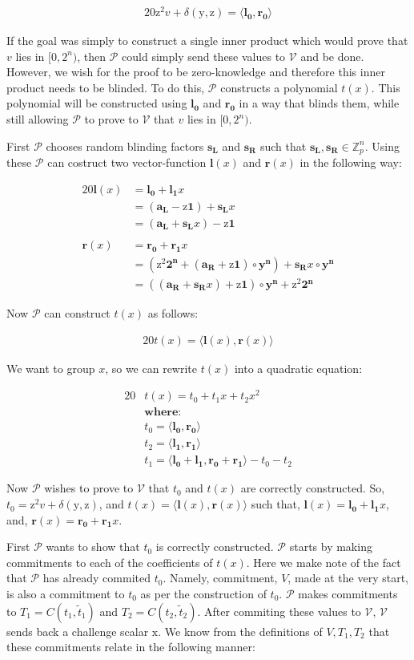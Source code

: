 \documentclass{article}
\newcommand{\eq}[1]{\begin{alignat*}{20}#1\end{alignat*}}
\renewcommand{\vec}[1]{\boldsymbol{#1}}
\newcommand{\ran}[1]{\mathrm{#1}}
\newcommand{\vecran}[1]{\mathbf{#1}}
\newcommand{\V}{\mathcal{V}}
\renewcommand{\P}{\mathcal{P}}
\newcommand{\Z}{\mathbb{Z}}
\renewcommand{\tt}{\widetilde{t}}
\newcommand{\dotp}[2]{\langle #1, #2 \rangle}
\newcommand{\opn}[1]{\operatorname{#1}}
\newcommand{\vecl}[1]{\vec{#1_{\opn{L}}}}
\newcommand{\vecr}[1]{\vec{#1_{\opn{R}}}}
\begin{document}
\eq{
	\ran{z^2}v + \delta(\ran{y},\ran{z}) = \dotp{\vec{l_0}}{\vec{r_0}}
}

If the goal was simply to construct a single inner product which
would prove that $v$ lies in $[0,2^n)$, then $\P$ could simply send
these values to $\V$ and be done. However, we wish for the proof to be
zero-knowledge and therefore this inner product needs to be blinded. To
do this, $\P$ constructs a polynomial $t(x)$. This polynomial will
be constructed using $\vec{l_0}$ and $\vec{r_0}$ in a way that blinds
them, while still allowing $\P$ to prove to $\V$ that $v$ lies in
$[0,2^n)$.

First $\P$ chooses random blinding factors $\vecran{s_L}$ and
$\vecran{s_R}$ such that $\vecl{s},\vecr{s}\in \Z^n_p$. Using these
$\P$ can costruct two vector-function $\vec{l}(x)$ and $\vec{r}(x)$
in the following way:

\eq{
	\vec{l}(x) &= \vec{l_0} + \vec{l_1}x \\ &= (\vecl{a} - \ran{z}\vec{1}) + \vecl{s}x \\ &= (\vecl{a} + \vecl{s}x) - \ran{z}\vec{1}\\&\\
	\vec{r}(x) &= \vec{r_0} + \vec{r_1}x \\ &= (\ran{z^2}\vec{2^n} + (\vecr{a} + \ran{z}\vec{1})\circ\vecran{y^n}) + \vecr{s}x\circ\vecran{y^n} \\ &= ((\vecr{a} + \vecr{s}x) + \ran{z}\vec{1}) \circ \vecran{y^n} + \ran{z}^2\vec{2^n}
}

Now $\P$ can construct $t(x)$ as follows:

\eq{
	t(x) = \dotp{\vec{l}(x)}{\vec{r}(x)}
}

We want to group $x$, so we can rewrite $t(x)$ into a quadratic equation:

\eq{
	&t(x) = t_0 + t_1x + t_2x^2 \\
	&\textbf{where:} \\
	&t_0 = \dotp{\vec{l_0}}{\vec{r_0}}\\
	&t_2 = \dotp{\vec{l_1}}{\vec{r_1}}\\
	&t_1 = \dotp{\vec{l_0}+\vec{l_1}}{\vec{r_0} + \vec{r_1}} - t_0 - t_2
}

Now $\P$ wishes to prove to $\V$ that $t_0$ and $t(x)$ are correctly
constructed. So, $t_0 = \ran{z^2}v + \delta(\ran{y},\ran{z})$, and $t(x)
= \dotp{\vec{l}(x)}{\vec{r}(x)}$ such that, $\vec{l}(x) = \vec{l_0}
+ \vec{l_1}x$, and, $\vec{r}(x) = \vec{r_0} + \vec{r_1}x$.

First $\P$ wants to show that $t_0$ is correctly constructed. $\P$
starts by making commitments to each of the coefficients of $t(x)$. Here
we make note of the fact that $\P$ has already commited $t_0$. Namely,
commitment, $V$, made at the very start, is also a commitment to $t_0$
as per the construction of $t_0$. $\P$ makes commitments to $T_1 =
C(t_1, \tt_1)$ and $T_2 = C(t_2, \tt_2)$. After commiting these values
to $\V$, $\V$ sends back a challenge scalar $\ran{x}$. We know from
the definitions of $V, T_1, T_2$ that these commitments relate in the
following manner:
\end{document}
